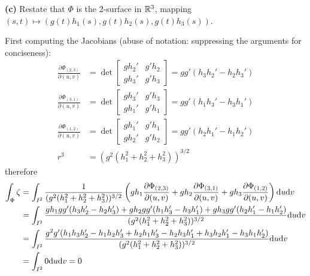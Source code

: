 \documentclass[a4paper, 12pt]{article}
\begin{document}
\begin{solution}
\textbf{(c)}
Restate that $\Phi$ is the 2-surface in $\mathbb{R}^3$, mapping $(s, t) \mapsto (g(t)h_1(s), g(t) h_2(s), g(t) h_3(s))$.

First computing the Jacobians (abuse of notation: suppressing the arguments for conciseness):
\begin{align*}
    \frac{\partial \Phi_{(2, 3)}}{\partial (u, v)} &= \det \begin{bmatrix}
        g h_2' & g' h_2 \\
        g h_3' & g' h_3
    \end{bmatrix} = gg' (h_3 h_2' - h_2 h_3')\\
    \frac{\partial \Phi_{(3, 1)}}{\partial (u, v)} &= \det \begin{bmatrix}
        g h_3' & g' h_3 \\
        g h_1' & g' h_1
    \end{bmatrix}  = gg'(h_1 h_3' - h_3 h_1') \\
    \frac{\partial \Phi_{(1, 2)}}{\partial (u, v)} &= \det \begin{bmatrix}
        g h_1' & g' h_1 \\
        g h_2' & g' h_2
    \end{bmatrix}  = gg' (h_2 h_1' - h_1 h_2') \\
    r^3 &= (g^2(h_1^2 + h_2^2 + h_3^2))^{3/2}
\end{align*}
therefore
\begin{align*}
    \int_\Phi \zeta &= \int_{I^2} \frac{1}{(g^2(h_1^2 + h_2^2 + h_3^2))^{3/2}}\left(gh_1 \frac{\partial \Phi_{(2, 3)}}{\partial (u, v)} + gh_2 \frac{\partial \Phi_{(3, 1)}}{\partial (u, v)} + gh_3 \frac{\partial \Phi_{(1, 2)}}{\partial (u, v)}\right) \mathrm{d} u \mathrm{d} v \\
    &= \int_{I^2} \frac{gh_1  gg' (h_3 h_2' - h_2 h_3') + gh_2gg'(h_1 h_3' - h_3 h_1') + gh_3 gg' (h_2 h_1' - h_1 h_2')}{(g^2(h_1^2 + h_2^2 + h_3^2))^{3/2}} \mathrm{d} u \mathrm{d} v \\
    &= \int_{I^2} \frac{g^2 g' (h_1h_3h_2' - h_1h_2h_3' + h_2h_1h_3' - h_2h_3h_1' + h_3h_2h_1' - h_3 h_1 h_2')}{(g^2(h_1^2 + h_2^2 + h_3^2))^{3/2}} \mathrm{d} u \mathrm{d} v \\
    &= \int_{I^2} 0 \mathrm{d} u \mathrm{d} v = 0
\end{align*}
\end{solution}
\end{document}
